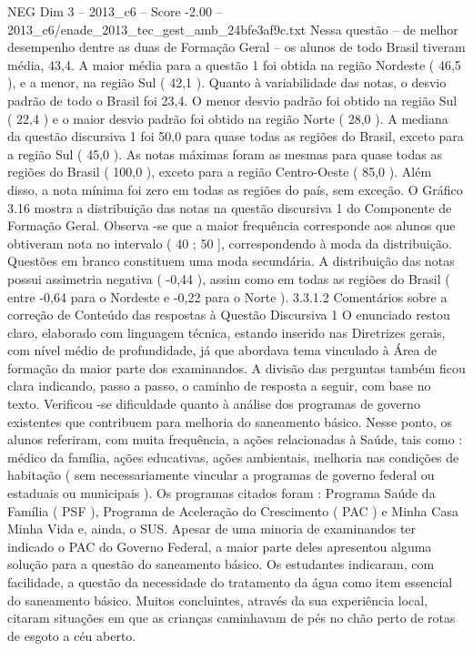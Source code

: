 \begin{textsample}{NEG Dim 3 – 2013\_c6 – Score -2.00 – 2013\_c6/enade\_2013\_tec\_gest\_amb\_24bfe3af9c.txt}
Nessa questão – de melhor desempenho dentre as duas de Formação Geral – os alunos de todo Brasil tiveram média, 43,4.
A maior média para a questão 1 foi obtida na região Nordeste ( 46,5 ), e a menor, na região Sul ( 42,1 ).
Quanto à variabilidade das notas, o desvio padrão de todo o Brasil foi 23,4.
O menor desvio padrão foi obtido na região Sul ( 22,4 ) e o maior desvio padrão foi obtido na região Norte ( 28,0 ).
A mediana da questão discursiva 1 foi 50,0 para quase todas as regiões do Brasil, exceto para a região Sul ( 45,0 ).
As notas máximas foram as mesmas para quase todas as regiões do Brasil ( 100,0 ), exceto para a região Centro-Oeste ( 85,0 ).
Além disso, a nota mínima foi zero em todas as regiões do país, sem exceção.
O Gráfico 3.16 mostra a distribuição das notas na questão discursiva 1 do Componente de Formação Geral.
Observa -se que a maior frequência corresponde aos alunos que obtiveram nota no intervalo ( 40 ; 50 ], correspondendo à moda da distribuição.
Questões em branco constituem uma moda secundária.
A distribuição das notas possui assimetria negativa ( -0,44 ), assim como em todas as regiões do Brasil ( entre -0,64 para o Nordeste e -0,22 para o Norte ). 3.3.1.2 Comentários sobre a correção de Conteúdo das respostas à Questão Discursiva 1 O enunciado restou claro, elaborado com linguagem técnica, estando inserido nas Diretrizes gerais, com nível médio de profundidade, já que abordava tema vinculado à Área de formação da maior parte dos examinandos.
A divisão das perguntas também ficou clara indicando, passo a passo, o caminho de resposta a seguir, com base no texto.
Verificou -se dificuldade quanto à análise dos programas de governo existentes que contribuem para melhoria do saneamento básico.
Nesse ponto, os alunos referiram, com muita frequência, a ações relacionadas à Saúde, tais como : médico da família, ações educativas, ações ambientais, melhoria nas condições de habitação ( sem necessariamente vincular a programas de governo federal ou estaduais ou municipais ).
Os programas citados foram : Programa Saúde da Família ( PSF ), Programa de Aceleração do Crescimento ( PAC ) e Minha Casa Minha Vida e, ainda, o SUS.
Apesar de uma minoria de examinandos ter indicado o PAC do Governo Federal, a maior parte deles apresentou alguma solução para a questão do saneamento básico.
Os estudantes indicaram, com facilidade, a questão da necessidade do tratamento da água como item essencial do saneamento básico.
Muitos concluintes, através da sua experiência local, citaram situações em que as crianças caminhavam de pés no chão perto de rotas de esgoto a céu aberto.

\end{textsample}
